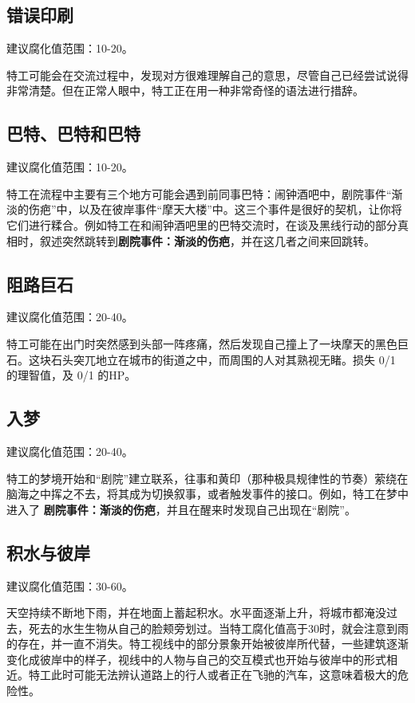 \subsection{错误印刷}

建议腐化值范围：10-20。

特工可能会在交流过程中，发现对方很难理解自己的意思，尽管自己已经尝试说得非常清楚。但在正常人眼中，特工正在用一种非常奇怪的语法进行措辞。

\subsection{巴特、巴特和巴特}

建议腐化值范围：10-20。

特工在流程中主要有三个地方可能会遇到前同事巴特：闹钟酒吧中，剧院事件“渐淡的伤疤”中，以及在彼岸事件“摩天大楼”中。这三个事件是很好的契机，让你将它们进行糅合。例如特工在和闹钟酒吧里的巴特交流时，在谈及黑线行动的部分真相时，叙述突然跳转到\textbf{剧院事件：渐淡的伤疤}，并在这几者之间来回跳转。

\subsection{阻路巨石}

建议腐化值范围：20-40。

特工可能在出门时突然感到头部一阵疼痛，然后发现自己撞上了一块摩天的黑色巨石。这块石头突兀地立在城市的街道之中，而周围的人对其熟视无睹。损失 0/1 的理智值，及 0/1 的HP。

\subsection{入梦}

建议腐化值范围：20-40。

特工的梦境开始和“剧院”建立联系，往事和黄印（那种极具规律性的节奏）萦绕在脑海之中挥之不去，将其成为切换叙事，或者触发事件的接口。例如，特工在梦中进入了 \textbf{剧院事件：渐淡的伤疤}，并且在醒来时发现自己出现在“剧院”。

\subsection{积水与彼岸}

建议腐化值范围：30-60。

天空持续不断地下雨，并在地面上蓄起积水。水平面逐渐上升，将城市都淹没过去，死去的水生生物从自己的脸颊旁划过。当特工腐化值高于30时，就会注意到雨的存在，并一直不消失。特工视线中的部分景象开始被彼岸所代替，一些建筑逐渐变化成彼岸中的样子，视线中的人物与自己的交互模式也开始与彼岸中的形式相近。特工此时可能无法辨认道路上的行人或者正在飞驰的汽车，这意味着极大的危险性。


